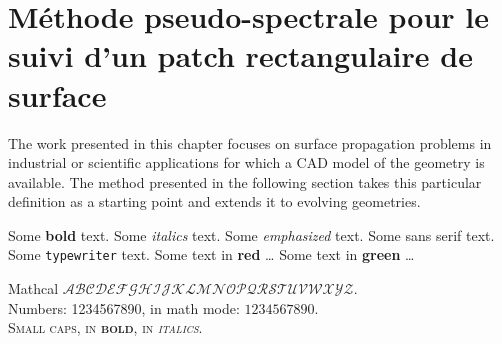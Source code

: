 \def\chapterabstract{In this chapter, we present a set of methods designed for tracking with high-order accuracy the propagation of surfaces in three dimensions with arbitrary geometric and topological complexity. Targeted applications are engineering and scientific problems for which a CAD (computer-aided design) model of the geometry is available, i.e. surface patches with high-order parameterizations as well as topological connectivity. Our method uses and maintains such a representation throughout the propagation. Validity of the dynamic boundary-representation model is ensured by handling geometric singularities. Examples are presented to demonstrate the accuracy of the pseudo-spectral method used for tracking each surface patch.
A strategy for deriving a dynamic surface mesh is finally proposed for applications such as Finite Element/Volume computations with body-fitted volume grids in domains with deforming boundaries. }

\chapter{Méthode pseudo-spectrale pour le suivi d'un patch rectangulaire de surface}


\printskip
\printchapapp
The work presented in this chapter focuses on surface propagation problems in industrial or scientific applications for which a CAD model of the geometry is available. The method presented in the following section takes this particular definition as a starting point and extends it to evolving geometries. \par

Some \textbf{bold} text. Some \textit{italics} text. Some \emph{emphasized} text. Some \textsf{sans serif} text. Some \texttt{typewriter} text. {\color{myred} Some text in \textbf{red} \ldots} {\color{mygreen} Some text in \textbf{green} \ldots} \par
Mathcal $\mathcal{ABCDEFGHIJKLMNOPQRSTUVWXYZ}$.\\
Numbers: 1234567890, in math mode: $1234567890$.\\
{\scshape Small caps, in \textbf{bold}, in \textit{italics}.}

